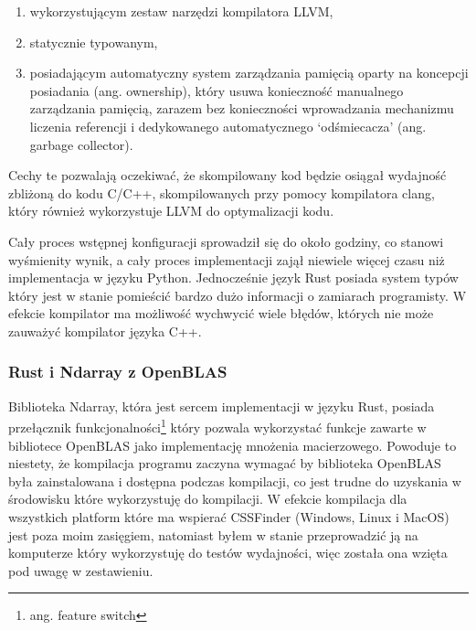 \documentclass[11pt, a4paper]{article}
\begin{document}
\begin{sloppypar}
\begin{enumerate}
      \item wykorzystującym zestaw narzędzi kompilatora LLVM,

      \item statycznie typowanym,

      \item posiadającym automatyczny system zarządzania pamięcią oparty na koncepcji posiadania
        (ang. ownership), który usuwa konieczność manualnego zarządzania pamięcią,
        zarazem bez konieczności wprowadzania mechanizmu liczenia referencji i
        dedykowanego automatycznego `odśmiecacza' (ang. garbage collector).
    \end{enumerate}

    Cechy te pozwalają oczekiwać, że skompilowany kod będzie osiągał wydajność zbliżoną do
    kodu C/C++, skompilowanych przy pomocy kompilatora clang, który również wykorzystuje
    LLVM do optymalizacji kodu.

    Cały proces wstępnej konfiguracji sprowadził się do około godziny, co stanowi
    wyśmienity wynik, a cały proces implementacji zajął niewiele więcej czasu niż implementacja
    w języku Python. Jednocześnie język Rust posiada system typów który jest w stanie
    pomieścić bardzo dużo informacji o zamiarach programisty. W efekcie kompilator ma możliwość
    wychwycić wiele błędów, których nie może zauważyć kompilator języka C++.

    \subsubsection{Rust i Ndarray z OpenBLAS}
    Biblioteka Ndarray, która jest sercem implementacji w języku Rust, posiada
    przełącznik funkcjonalności\footnote{ang. feature switch} który pozwala wykorzystać funkcje
    zawarte w bibliotece OpenBLAS jako implementację mnożenia macierzowego. Powoduje to
    niestety, że kompilacja programu zaczyna wymagać by biblioteka OpenBLAS była zainstalowana
    i dostępna podczas kompilacji, co jest trudne do uzyskania w środowisku które
    wykorzystuję do kompilacji. W efekcie kompilacja dla wszystkich platform które ma wspierać
    CSSFinder (Windows, Linux i MacOS) jest poza moim zasięgiem, natomiast byłem w stanie
    przeprowadzić ją na komputerze który wykorzystuję do testów wydajności, więc została
    ona wzięta pod uwagę w zestawieniu.


\end{sloppypar}
\end{document}
